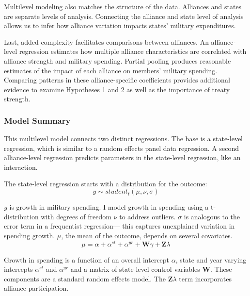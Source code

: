 \documentclass[12pt]{article}
\begin{document}
Multilevel modeling also matches the structure of the data.
Alliances and states are separate levels of analysis. 
Connecting the alliance and state level of analysis allows us to infer how alliance variation impacts states' military expenditures. 


Last, added complexity facilitates comparisons between alliances. 
An alliance-level regression estimates how multiple alliance characteristics are correlated with alliance strength and military spending.
Partial pooling produces reasonable estimates of the impact of each alliance on members' military spending. 
Comparing patterns in these alliance-specific coefficients provides additional evidence to examine Hypotheses 1 and 2 as well as the importance of treaty strength. 


\subsubsection{Model Summary} 

This multilevel model connects two distinct regressions. 
The base is a state-level regression, which is similar to a random effects panel data regression.
A second alliance-level regression predicts parameters in the state-level regression, like an interaction. 


The state-level regression starts with a distribution for the outcome:
\begin{equation}
y \sim student_t(\mu, \nu, \sigma)
\end{equation}
 
$y$ is growth in military spending. 
I model growth in spending using a t-distribution with degrees of freedom $\nu$ to address outliers.
$\sigma$ is analogous to the error term in a frequentist regression--- this captures unexplained variation in spending growth.  
$\mu$, the mean of the outcome, depends on several covariates.
\begin{equation}
\mu = \alpha + \alpha^{st} + \alpha^{yr} +\textbf{W} \gamma + \textbf{Z} \lambda
\end{equation}


Growth in spending is a function of an overall intercept $\alpha$, state and year varying intercepts $\alpha^{st}$ and $\alpha^{yr}$ and a matrix of state-level control variables $\textbf{W}$.
These components are a standard random effects model. 
The $\textbf{Z} \lambda$ term incorporates alliance participation.
\end{document}
